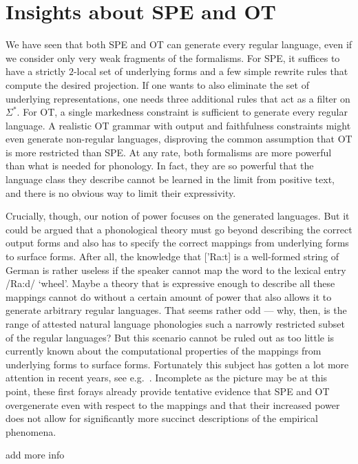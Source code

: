 \section{Insights about SPE and OT}
We have seen that both SPE and OT can generate every regular language, even if we consider only very weak fragments of the formalisms.
For SPE, it suffices to have a strictly $2$-local set of underlying forms and a few simple rewrite rules that compute the desired projection.
If one wants to also eliminate the set of underlying representations, one needs three additional rules that act as a filter on $\Sigma^*$.
For OT, a single markedness constraint is sufficient to generate every regular language.
A realistic OT grammar with output and faithfulness constraints might even generate non-regular languages, disproving the common assumption that OT is more restricted than SPE\@.
At any rate, both formalisms are more powerful than what is needed for phonology.
In fact, they are so powerful that the language class they describe cannot be learned in the limit from positive text, and there is no obvious way to limit their expressivity.

Crucially, though, our notion of power focuses on the generated languages.
But it could be argued that a phonological theory must go beyond describing the correct output forms and also has to specify the correct mappings from underlying forms to surface forms.
After all, the knowledge that ['Ra:t] is a well-formed string of German is rather useless if the speaker cannot map the word to the lexical entry /Ra:d/ `wheel'.
Maybe a theory that is expressive enough to describe all these mappings cannot do without a certain amount of power that also allows it to generate arbitrary regular languages.
That seems rather odd --- why, then, is the range of attested natural language phonologies such a narrowly restricted subset of the regular languages?
But this scenario cannot be ruled out as too little is currently known about the computational properties of the mappings from underlying forms to surface forms.
Fortunately this subject has gotten a lot more attention in recent years, see e.g.\ \citet{Chandlee14}.
Incomplete as the picture may be at this point, these first forays already provide tentative evidence that SPE and OT overgenerate even with respect to the mappings and that their increased power does not allow for significantly more succinct descriptions of the empirical phenomena.

\begin{literature}
add more info
\end{literature}
